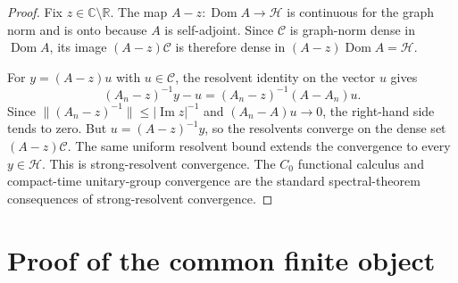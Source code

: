 \documentclass[11pt]{article}
\theoremstyle{definition}
\theoremstyle{remark}
\newcommand{\R}{\mathbb R}
\newcommand{\C}{\mathbb C}
\newcommand{\Hh}{\mathcal H}
\newcommand{\Dom}{\operatorname{Dom}}
\newcommand{\im}{\operatorname{Im}}
\begin{document}
\begin{proof}
Fix $z\in\C\setminus\R$.  The map
$A-z:\Dom A\to\Hh$ is continuous for the graph norm and is onto because $A$
is self-adjoint.  Since $\mathcal C$ is graph-norm dense in $\Dom A$, its image
$(A-z)\mathcal C$ is therefore dense in $(A-z)\Dom A=\Hh$.

For $y=(A-z)u$ with $u\in\mathcal C$, the resolvent identity on the vector $u$
gives
\[
 (A_n-z)^{-1}y-u
 =(A_n-z)^{-1}(A-A_n)u.
\]
Since $\|(A_n-z)^{-1}\|\le |\im z|^{-1}$ and $(A_n-A)u\to0$, the right-hand
side tends to zero.  But $u=(A-z)^{-1}y$, so the resolvents converge on the
dense set $(A-z)\mathcal C$.  The same uniform resolvent bound extends the
convergence to every $y\in\Hh$.  This is strong-resolvent convergence.  The
$C_0$ functional calculus and compact-time unitary-group convergence are the
standard spectral-theorem consequences of strong-resolvent convergence.
\end{proof}

\section{Proof of the common finite object}
\label{app:proof-common-object}
\end{document}
